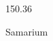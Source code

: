 \documentclass[12pt]{article}
\begin{document}
\hfill{}
\vfill
\begin{center}
  {\fontsize{50}{60}
  }

  150.36

Samarium
\end{center}
\vfill
\end{document}
